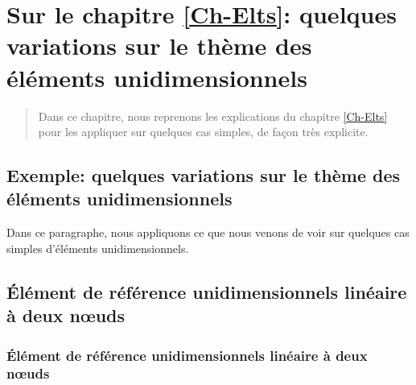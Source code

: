 \ifVersionAvecExemplesSepares
   \chapter{Sur le chapitre \ref{Ch-Elts}: quelques variations sur le thème des éléments unidimensionnels}
   \begin{abstract}
   Dans ce chapitre, nous reprenons les explications du chapitre \ref{Ch-Elts} pour les appliquer
   sur quelques cas simples, de façon très explicite.
   \end{abstract}
\else
   \section{Exemple: quelques variations sur le thème des éléments unidimensionnels}

   Dans ce paragraphe, nous appliquons ce que nous venons de voir sur quelques cas simples d'éléments unidimensionnels.
\fi

\medskip
\ifVersionAvecExemplesSepares
   \section{Élément de référence unidimensionnels linéaire à deux nœuds}\label{Sec-Elt1D2}
\else
   \subsection{Élément de référence unidimensionnels linéaire à deux nœuds}\label{Sec-Elt1D2}
\fi

